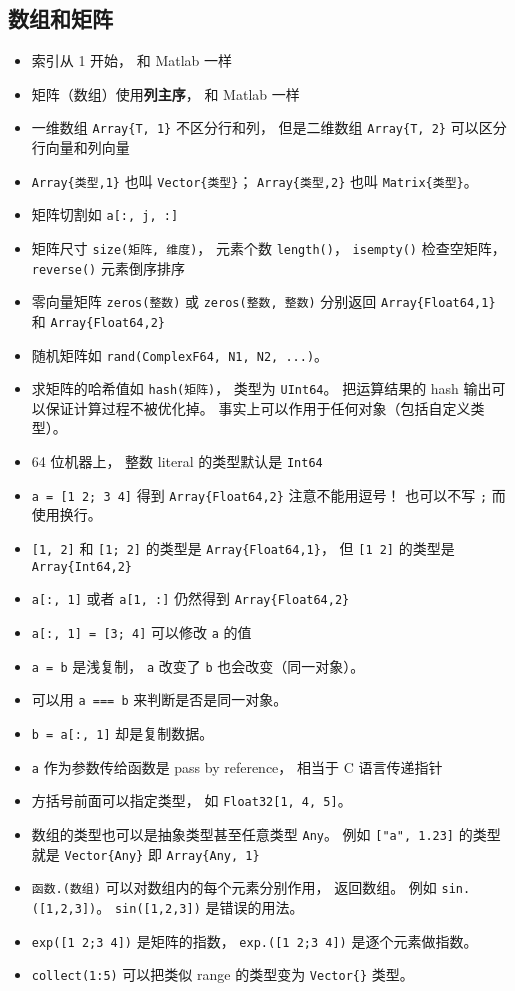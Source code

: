 \subsection{数组和矩阵}
\begin{itemize}
\item 索引从 1 开始， 和 Matlab 一样
\item 矩阵（数组）使用\textbf{列主序}， 和 Matlab 一样
\item 一维数组 \verb|Array{T, 1}| 不区分行和列， 但是二维数组 \verb|Array{T, 2}| 可以区分行向量和列向量
\item \verb|Array{类型,1}| 也叫 \verb|Vector{类型}|； \verb|Array{类型,2}| 也叫 \verb|Matrix{类型}|。
\item 矩阵切割如 \verb|a[:, j, :]|
\item 矩阵尺寸 \verb|size(矩阵, 维度)|， 元素个数 \verb|length()|， \verb|isempty()| 检查空矩阵， \verb|reverse()| 元素倒序排序
\item 零向量矩阵 \verb|zeros(整数)| 或 \verb|zeros(整数, 整数)| 分别返回 \verb|Array{Float64,1}| 和 \verb|Array{Float64,2}|
\item 随机矩阵如 \verb|rand(ComplexF64, N1, N2, ...)|。
\item 求矩阵的哈希值如 \verb|hash(矩阵)|， 类型为 \verb|UInt64|。 把运算结果的 hash 输出可以保证计算过程不被优化掉。 事实上可以作用于任何对象（包括自定义类型）。
\item 64 位机器上， 整数 literal 的类型默认是 \verb|Int64|
\item \verb|a = [1 2; 3 4]| 得到 \verb|Array{Float64,2}| 注意不能用逗号！ 也可以不写 \verb|;| 而使用换行。
\item \verb|[1, 2]| 和 \verb|[1; 2]| 的类型是 \verb|Array{Float64,1}|， 但 \verb|[1 2]| 的类型是 \verb|Array{Int64,2}|
\item \verb|a[:, 1]| 或者 \verb|a[1, :]| 仍然得到 \verb|Array{Float64,2}|
\item \verb|a[:, 1] = [3; 4]| 可以修改 \verb|a| 的值
\item \verb|a = b| 是浅复制， \verb|a| 改变了 \verb|b| 也会改变（同一对象）。
\item 可以用 \verb|a === b| 来判断是否是同一对象。
\item \verb|b = a[:, 1]| 却是复制数据。
\item \verb|a| 作为参数传给函数是 pass by reference， 相当于 C 语言传递指针
\item 方括号前面可以指定类型， 如 \verb|Float32[1, 4, 5]|。
\item 数组的类型也可以是抽象类型甚至任意类型 \verb|Any|。 例如 \verb|["a", 1.23]| 的类型就是 \verb|Vector{Any}| 即 \verb|Array{Any, 1}|
\item \verb|函数.(数组)| 可以对数组内的每个元素分别作用， 返回数组。 例如 \verb|sin.([1,2,3])|。 \verb|sin([1,2,3])| 是错误的用法。
\item \verb|exp([1 2;3 4])| 是矩阵的指数， \verb|exp.([1 2;3 4])| 是逐个元素做指数。
\item \verb|collect(1:5)| 可以把类似 range 的类型变为 \verb|Vector{}| 类型。
\end{itemize}

